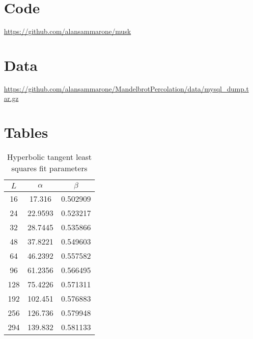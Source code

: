 \chapter{Code}
\url{https://github.com/alansammarone/musk}
\clearpage

\chapter{Data}
\url{https://github.com/alansammarone/MandelbrotPercolation/data/mysql_dump.tar.gz}
\clearpage
\chapter{Tables}
\begin{table}[H]
\begin{center}
    \begin{tabular}{||c c c|| }
    \hline
      $L$&   $\alpha$ &   $\beta$ \\
    \hline
      16 &    17.316  &  0.502909 \\
      24 &    22.9593 &  0.523217 \\
      32 &    28.7445 &  0.535866 \\
      48 &    37.8221 &  0.549603 \\
      64 &    46.2392 &  0.557582 \\
      96 &    61.2356 &  0.566495 \\
     128 &    75.4226 &  0.571311 \\
     192 &   102.451  &  0.576883 \\
     256 &   126.736  &  0.579948 \\
     294 &   139.832  &  0.581133 \\
    \hline
    \end{tabular}
\end{center}
\caption{Hyperbolic tangent least squares fit parameters}
\label{table:sec3_tahn_fit_parameters}
\end{table}